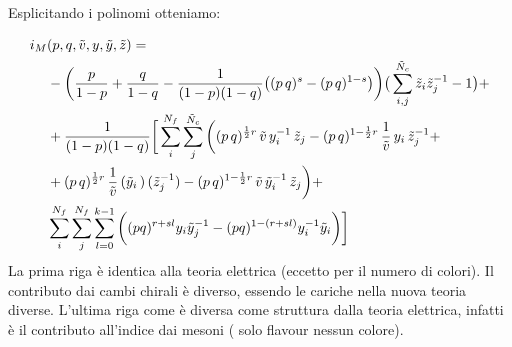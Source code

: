 \documentclass[a4paper,12pt]{article}
\begin{document}
Esplicitando i polinomi otteniamo:

\begin{align*}
 i_M &(p,q, \tilde v, y,\tilde y ,\tilde z) = \\
& -\bigg({p \over 1-p}+{q \over 1-q} -{1 \over (1-p)(1-q)} \big((p\,q)^{s}- (p\,q)^{1-s}\big)
\bigg) \big( \sum_{i,j}^{\tilde N_c} \tilde z_i \tilde z_j^{-1} -1\big ) + \\
& +{1\over (1-p)(1-q)}\bigg[ \sum_i^{N_f}\sum_j^{\tilde N_c} \bigg( (p\,q)^{{1 \over 2 } r} \,\tilde v \, y_i^{-1}\, \tilde z_j
- (p\,q)^{1- {1\over 2}r} \, {1 \over \tilde v}\, y_i \,
\tilde z_j^{-1} + \\
& + (p\,q)^{{1 \over 2 } r}\, {1\over \tilde v}\,
({\tilde y_i}\,) \,
(\tilde z_j^{-1})
- (p\,q)^{1-  {1\over 2}r} \, \tilde v \,
{\tilde y_i}^{-1} \,
\tilde z_j \bigg) + \\
 &\sum_i^{N_f} \sum_j^{N_f} \sum_{l=0}^{k-1}   \bigg(  (pq)^{ r + s l  } y_i \tilde y_j^{-1}   - (pq)^{1 -( r + s l )}
y_i^{-1}  {\tilde y_i}  \bigg) \bigg] \\
\end{align*}
La prima riga è identica alla teoria elettrica (eccetto per il numero di colori).
Il contributo dai cambi chirali è diverso, essendo le cariche nella nuova teoria diverse.
L'ultima riga come è diversa come struttura dalla teoria elettrica, infatti è il contributo all'indice dai mesoni ( solo flavour nessun colore).
\end{document}
